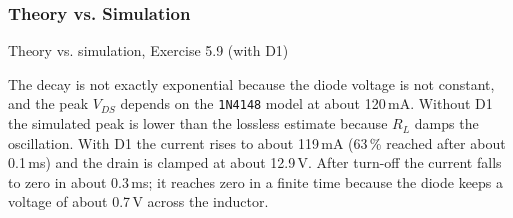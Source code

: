 \subsubsection*{Theory vs. Simulation}
\begin{comparison}{Theory vs. simulation, Exercise 5.9 (with D1)}
\end{comparison}
\begin{solution}
The decay is not exactly exponential because the diode voltage is not constant, and the peak $V_{DS}$ depends on the
\texttt{1N4148} model at about 120\,mA. Without D1 the simulated peak is lower than the lossless estimate because
$R_L$ damps the oscillation. With D1 the current rises to about 119\,mA (63\,\% reached after about 0.1\,ms) and the drain is
clamped at about 12.9\,V. After turn-off the current falls to zero in about 0.3\,ms; it reaches zero in a finite time because the
diode keeps a voltage of about 0.7\,V across the inductor.
\end{solution}
